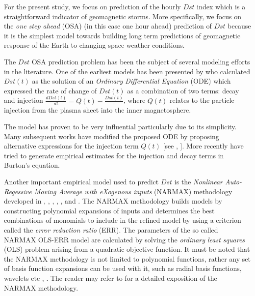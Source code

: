 For the present study, we focus on prediction of the hourly $Dst$ index which is a straightforward indicator of geomagnetic storms. More specifically, we focus on the \emph{one step ahead} (OSA) (in this case one hour ahead) prediction of $Dst$ because it is the simplest model towards building long term predictions of geomagnetic response of the Earth to changing space weather conditions. 

The $Dst$ OSA prediction problem has been the subject of several modeling efforts in the literature. One of the earliest models has been presented by \cite{JGR:JGR10260} who calculated $Dst(t)$ as the solution of an \emph{Ordinary Differential Equation} (ODE) which expressed the rate of change of $Dst(t)$ as a combination of two terms: decay and injection $\frac{d Dst(t)}{dt} = Q(t) - \frac{Dst(t)}{\tau}$, where $Q(t)$ relates to the particle injection from the plasma sheet into the inner magnetosphere. 

The \cite{JGR:JGR10260} model has proven to be very influential particularly due to its simplicity. Many subsequent works have modified the proposed ODE by proposing alternative expressions for the injection term $Q(t)$ [see \cite{Wang:Dst}, \cite{JGRA:JGRA14856}]. More recently \cite{Ballatore2014} have tried to generate empirical estimates for the injection and decay terms in Burton's equation.

Another important empirical model used to predict $Dst$ is the \emph{Nonlinear Auto-Regessive Moving Average with eXogenous inputs} (NARMAX) methodology developed in \cite{doi:10.1080/00207178908559767}, \cite{GRL:GRL13494}, \cite{GRL:GRL20944}, \cite{JGRA:JGRA18657}, \cite{balikhin:narmax}, \cite{JGRA:JGRA20661} and \cite{JGRA:JGRA50192}. The NARMAX methodology builds models by constructing polynomial expansions of inputs and determines the best combinations of monomials to include in the refined model by using a criterion called the \emph{error reduction ratio} (ERR). The parameters of the so called NARMAX OLS-ERR model are calculated by solving the \emph{ordinary least squares} (OLS) problem arising from a quadratic objective function. It must be noted that the NARMAX methodology is not limited to polynomial functions, rather any set of basis function expansions can be used with it, such as radial basis functions, wavelets etc \cite{doi:10.1080/00207720600903011}, \cite{JGRA:JGRA17327}. The reader may refer to \cite{billings2013nonlinear} for a detailed exposition of the NARMAX methodology.

